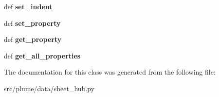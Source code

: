 \begin{DoxyCompactItemize}
\item 
def {\bfseries set\+\_\+indent}\hypertarget{classplume-creator_1_1src_1_1plume_1_1data_1_1sheet__hub_1_1_sheet_hub_a5b4f103cce65863520c226180617cd46}{}\label{classplume-creator_1_1src_1_1plume_1_1data_1_1sheet__hub_1_1_sheet_hub_a5b4f103cce65863520c226180617cd46}

\item 
def {\bfseries set\+\_\+property}\hypertarget{classplume-creator_1_1src_1_1plume_1_1data_1_1sheet__hub_1_1_sheet_hub_ae8438ba8a36614ec826995a9e9f24444}{}\label{classplume-creator_1_1src_1_1plume_1_1data_1_1sheet__hub_1_1_sheet_hub_ae8438ba8a36614ec826995a9e9f24444}

\item 
def {\bfseries get\+\_\+property}\hypertarget{classplume-creator_1_1src_1_1plume_1_1data_1_1sheet__hub_1_1_sheet_hub_a1d2e941b9c23eb894dbbb0bf17137351}{}\label{classplume-creator_1_1src_1_1plume_1_1data_1_1sheet__hub_1_1_sheet_hub_a1d2e941b9c23eb894dbbb0bf17137351}

\item 
def {\bfseries get\+\_\+all\+\_\+properties}\hypertarget{classplume-creator_1_1src_1_1plume_1_1data_1_1sheet__hub_1_1_sheet_hub_a5f9426db539489afaed7b7f6ea6420b0}{}\label{classplume-creator_1_1src_1_1plume_1_1data_1_1sheet__hub_1_1_sheet_hub_a5f9426db539489afaed7b7f6ea6420b0}

\end{DoxyCompactItemize}


The documentation for this class was generated from the following file\+:\begin{DoxyCompactItemize}
\item 
src/plume/data/sheet\+\_\+hub.\+py\end{DoxyCompactItemize}
